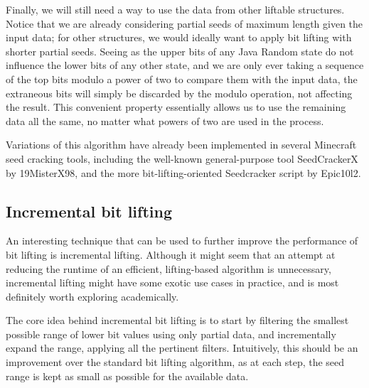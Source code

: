 \documentclass{article}
\begin{document}
Finally, we will still need a way to use the data from other liftable structures. Notice that we are already considering partial seeds of maximum length given the input data; for other structures, we would ideally want to apply bit lifting with shorter partial seeds. Seeing as the upper bits of any Java Random state do not influence the lower bits of any other state, and we are only ever taking a sequence of the top bits modulo a power of two to compare them with the input data, the extraneous bits will simply be discarded by the modulo operation, not affecting the result. This convenient property essentially allows us to use the remaining data all the same, no matter what powers of two are used in the process.

Variations of this algorithm have already been implemented in several Minecraft seed cracking tools, including the well-known general-purpose tool SeedCrackerX by 19MisterX98, and the more bit-lifting-oriented Seedcracker script by Epic10l2. %

\subsection{Incremental bit lifting}
An interesting technique that can be used to further improve the performance of bit lifting is incremental lifting. Although it might seem that an attempt at reducing the runtime of an efficient, lifting-based algorithm is unnecessary, incremental lifting might have some exotic use cases in practice, and is most definitely worth exploring academically.

The core idea behind incremental bit lifting is to start by filtering the smallest possible range of lower bit values using only partial data, and incrementally expand the range, applying all the pertinent filters. Intuitively, this should be an improvement over the standard bit lifting algorithm, as at each step, the seed range is kept as small as possible for the available data.

\end{document}
